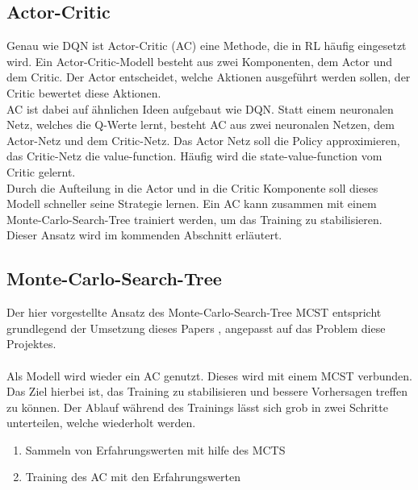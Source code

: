 \subsection{Actor-Critic}
Genau wie DQN ist Actor-Critic (AC) eine Methode, die in RL häufig eingesetzt wird.
Ein Actor-Critic-Modell besteht aus zwei Komponenten, dem Actor und dem Critic. Der Actor entscheidet, welche Aktionen ausgeführt werden sollen, der Critic bewertet diese Aktionen. 
\\
AC ist dabei auf ähnlichen Ideen aufgebaut wie DQN. Statt einem neuronalen Netz, welches die Q-Werte lernt, besteht AC aus zwei neuronalen Netzen, dem Actor-Netz und dem Critic-Netz. Das Actor Netz soll die Policy approximieren, das Critic-Netz die value-function. Häufig wird die state-value-function vom Critic gelernt. 
\\
Durch die Aufteilung in die Actor und in die Critic Komponente soll dieses Modell schneller seine Strategie lernen. 
Ein AC kann zusammen mit einem Monte-Carlo-Search-Tree trainiert werden, um das Training zu stabilisieren. Dieser Ansatz wird im kommenden Abschnitt erläutert.

\subsection{Monte-Carlo-Search-Tree}
Der hier vorgestellte Ansatz des Monte-Carlo-Search-Tree MCST entspricht grundlegend der Umsetzung dieses Papers , angepasst auf das Problem diese Projektes.
\\\\
Als Modell wird wieder ein AC genutzt. Dieses wird mit einem MCST verbunden. Das Ziel hierbei ist, das Training zu stabilisieren und bessere Vorhersagen treffen zu können. Der Ablauf während des Trainings lässt sich grob in zwei Schritte unterteilen, welche wiederholt werden.
\begin{enumerate}
	\item Sammeln von Erfahrungswerten mit hilfe des MCTS
	\item Training des AC mit den Erfahrungswerten
\end{enumerate}
